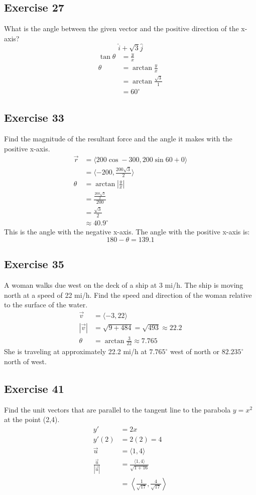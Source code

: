 \documentclass{math}
\begin{document}
\subsection*{Exercise 27}
What is the angle between the given vector and the positive direction of the
x-axis?
\[ \hat{i}+\sqrt{3}\hat{j} \]
\begin{align*}
  \tan\theta &= \frac{y}{x} \\
  \theta &= \arctan\frac{y}{x} \\
  &= \arctan\frac{\sqrt{3}}{1} \\
  &= 60^{\circ}
\end{align*}

\subsection*{Exercise 33}
Find the magnitude of the resultant force and the angle it makes with the
positive x-axis.
\begin{align*}
  \vec{r} &= \langle200\cos-300,200\sin60+0\rangle \\
  &= \langle-200,\frac{200\sqrt{3}}{2}\rangle \\
  \theta &= \arctan|\frac{y}{x}| \\
  &= \frac{\frac{200\sqrt{3}}{2}}{200} \\
  &= \frac{\sqrt{3}}{2} \\
  &\approx 40.9^{\circ}
\end{align*}
This is the angle with the negative x-axis. The angle with the positive x-axis
is:
\[ 180-\theta = 139.1 \]

\subsection*{Exercise 35}
A woman walks due west on the deck of a ship at 3 mi/h. The ship is moving
north at a speed of 22 mi/h. Find the speed and direction of the woman relative
to the surface of the water.
\begin{align*}
  \vec{v} &= \langle-3,22\rangle \\
  |\vec{v}| &= \sqrt{9+484} = \sqrt{493} \approx 22.2 \\
  \theta &= \arctan\frac{3}{22} \approx 7.765
\end{align*}
She is traveling at approximately 22.2 mi/h at \( 7.765^{\circ} \) west of
north or \( 82.235^{\circ} \) north of west.

\subsection*{Exercise 41}
Find the unit vectors that are parallel to the tangent line to the
parabola \( y = x^2 \) at the point (2,4).
\begin{align*}
  y' &= 2x \\
  y'(2) &= 2(2) = 4 \\
  \vec{u} &= \langle1,4\rangle \\
  \frac{\vec{u}}{|\vec{u}|} &= \frac{\langle1,4\rangle}{\sqrt{1+16}} \\
  &= \left\langle\frac{1}{\sqrt{17}},\frac{4}{\sqrt{17}}\right\rangle
\end{align*}
\end{document}
